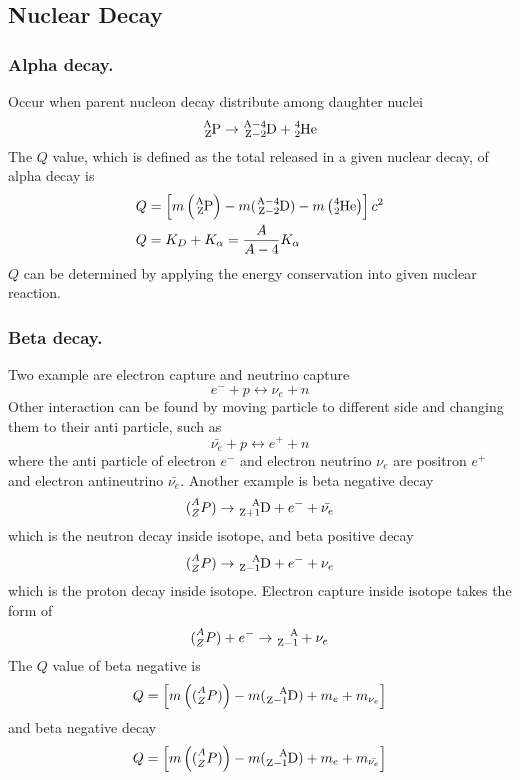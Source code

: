 \documentclass[../../../main.tex]{subfiles}
\begin{document}
\subsection*{Nuclear Decay}

\subsubsection*{Alpha decay.} Occur when parent nucleon decay distribute among daughter nuclei 
\begin{equation*}
    \ce{^A_ZP}\rightarrow\ce{^{A-4}_{Z-2}D}+\ce{^4_2He}
\end{equation*}
The $Q$ value, which is defined as the total released in a given nuclear decay, of alpha decay is 
\begin{align*}
    Q&=\left[m\left(\ce{^A_ZP}\right)-m(\ce{^{A-4}_{Z-2}D})-m\left(\ce{^4_2He}\right)\right]c^2\\
    Q&=K_D+K_\alpha=\frac{A}{A-4}K_\alpha
\end{align*}
$Q$ can be determined by applying the energy conservation into given nuclear reaction. 

\subsubsection*{Beta decay.} Two example are electron capture and neutrino capture 
\begin{equation*}
    e^-+p\leftrightarrow \nu_e+n
\end{equation*} 
Other interaction can be found by moving particle to different side and changing them to their anti particle, such as 
\begin{equation*}
    \bar{\nu_e}+p\leftrightarrow e^++n
\end{equation*}
where the anti particle of electron $e^-$ and electron neutrino $\nu_e$ are positron $e^+$ and electron antineutrino $\bar{\nu_e}$. Another example is beta negative decay
\begin{equation*}
    \ce(^A_ZP)\rightarrow\ce{^A_{Z+1}D}+e^-+\bar{\nu_e}
\end{equation*} 
which is the neutron decay inside isotope, and beta positive decay
\begin{equation*}
    \ce(^A_ZP)\rightarrow\ce{^A_{Z-1}D}+e^-+{\nu_e}
\end{equation*}
which is the proton decay inside isotope. Electron capture inside isotope takes the form of 
\begin{equation*}
    \ce(^A_ZP)+e^-\rightarrow \ce{^A_{Z-1}}+\nu_e
\end{equation*}
The $Q$ value of beta negative is 
\begin{equation*}
    Q=\left[m\left(\ce(^A_ZP)\right)-m(\ce{^A_{Z-1}D})+m_e+m_{\nu_e}\right]
\end{equation*}
and beta negative decay 
\begin{equation*}
    Q=\left[m\left(\ce(^A_ZP)\right)-m(\ce{^A_{Z-1}D})+m_e+m_{\bar{\nu_e}}\right]
\end{equation*}
\end{document}
